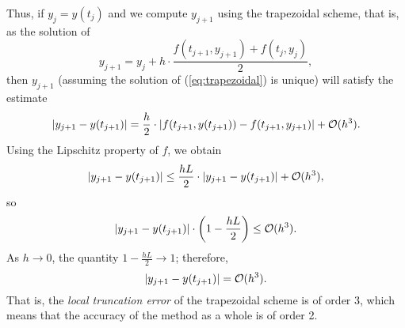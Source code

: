 \documentclass{homework}
\begin{document}
	Thus, if $y_j = y(t_j)$ and we compute $y_{j+1}$ using the trapezoidal scheme, that is, as the solution of
	\begin{equation}
		\label{eq:trapezoidal}
		y_{j+1} = y_j + h\cdot\frac{f(t_{j+1}, y_{j+1}) + f(t_j, y_j)}{2},
	\end{equation}
	then $y_{j+1}$ (assuming the solution of (\ref{eq:trapezoidal}) is unique) will satisfy the estimate
	\begin{equation}
		|y_{j+1} - y(t_{j+1})| = \frac{h}{2}\cdot|f(t_{j+1}, y(t_{j+1})) - f(t_{j+1}, y_{j+1})| + \mathcal{O}(h^3).
	\end{equation}
	Using the Lipschitz property of $f$, we obtain
	\begin{equation}
		|y_{j+1} - y(t_{j+1})| \le \frac{hL}{2}\cdot|y_{j+1} - y(t_{j+1})| + \mathcal{O}(h^3),
	\end{equation}
	so
	\begin{equation}
		|y_{j+1}-y(t_{j+1})| \cdot\left(1 - \frac{hL}{2}\right) \le \mathcal{O}(h^3).
	\end{equation}
	As $h \to 0$, the quantity $1 - \frac{hL}{2} \to 1$; therefore,
	\begin{equation}
		|y_{j+1} - y(t_{j+1})| = \mathcal{O}(h^3).
	\end{equation}
	That is, the \textit{local truncation error} of the trapezoidal scheme is of order 3, which means that the accuracy of the method as a whole is of order 2.
	
\end{document}
